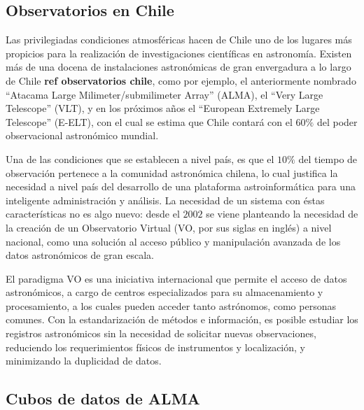 
\subsection{Observatorios en Chile}

Las privilegiadas condiciones atmosféricas hacen de Chile uno de los lugares
más propicios para la realización de investigaciones científicas en astronomía.
Existen más de una docena de instalaciones astronómicas de gran envergadura a
lo largo de Chile {\bf ref observatorios chile}, como por
ejemplo, el anteriormente nombrado ``Atacama Large Milimeter/submilimeter
Array'' (ALMA), el ``Very Large Telescope'' (VLT), y en los próximos años el
``European Extremely Large Telescope'' (E-ELT), con el cual se estima que Chile
contará con el
$60\%$ del poder observacional astronómico mundial.

Una de las condiciones que se establecen a nivel país, es que el $10\%$ del
tiempo de observación pertenece a la comunidad astronómica chilena, lo cual
justifica la necesidad a nivel país del desarrollo de una plataforma
astroinformática para una inteligente administración y análisis.
La necesidad de un sistema con éstas características no es algo nuevo:
desde el $2002$ se viene planteando la necesidad de la
creación de un Observatorio Virtual (VO, por sus siglas en inglés) a nivel
nacional, como una solución al acceso público y manipulación avanzada de los 
datos astronómicos de gran escala.

El paradigma VO es una iniciativa internacional que permite el acceso de datos
astronómicos, a cargo de centros especializados para su almacenamiento y
procesamiento, a los cuales pueden acceder tanto astrónomos, como personas
comunes. Con la estandarización de métodos e información, es posible estudiar
los registros astronómicos sin la necesidad de solicitar nuevas observaciones,
reduciendo los requerimientos físicos de instrumentos y localización, y
minimizando la duplicidad de datos.

\subsection{Cubos de datos de ALMA}

